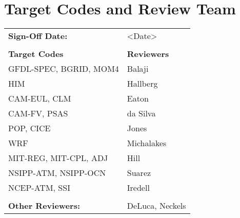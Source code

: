 \section{Target Codes and Review Team}

\begin{tabular}{l l}

{\bf Sign-Off Date:}          & <Date> \\ \\

{\bf Target Codes}            & {\bf Reviewers} \\
GFDL-SPEC, BGRID, MOM4        & Balaji \\ 
HIM                           & Hallberg \\
CAM-EUL, CLM                  & Eaton \\
CAM-FV, PSAS                  & da Silva\\
POP, CICE                     & Jones \\
WRF                           & Michalakes \\
MIT-REG, MIT-CPL, ADJ         & Hill \\
NSIPP-ATM, NSIPP-OCN          & Suarez \\
NCEP-ATM, SSI                 & Iredell \\ \\

{\bf Other Reviewers:}        & DeLuca, Neckels

\end{tabular}


%



%

